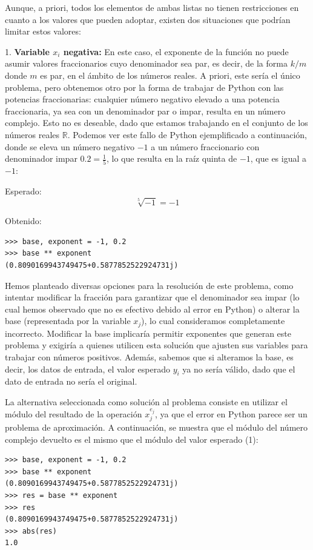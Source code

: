 \documentclass[conference,a4paper]{IEEEtran}
\begin{document}
Aunque, a priori, todos los elementos de ambas listas no tienen restricciones en cuanto a los valores que pueden adoptar, existen dos situaciones que podrían limitar estos valores:


1. \textbf{Variable \( x_i \) negativa:} En este caso, el exponente de la función no puede asumir valores fraccionarios cuyo denominador sea par, es decir, de la forma \( k/m \) donde \( m \) es par, en el ámbito de los números reales. A priori, este sería el único problema, pero obtenemos otro por la forma de trabajar de Python con las potencias fraccionarias: cualquier número negativo elevado a una potencia fraccionaria, ya sea con un denominador par o impar, resulta en un número complejo. Esto no es deseable, dado que estamos trabajando en el conjunto de los números reales \( \mathbb{R} \). Podemos ver este fallo de Python ejemplificado a continuación, donde se eleva un número negativo \( -1 \) a un número fraccionario con denominador impar \( 0.2 = \frac{1}{5} \), lo que resulta en la raíz quinta de \(-1\), que es igual a \(-1\):

Esperado:
\[
\sqrt[5]{-1} = -1
\]

Obtenido:
\begin{verbatim}
>>> base, exponent = -1, 0.2
>>> base ** exponent
(0.8090169943749475+0.5877852522924731j)
\end{verbatim}

Hemos planteado diversas opciones para la resolución de este problema, como intentar modificar la fracción para garantizar que el denominador sea impar (lo cual hemos observado que no es efectivo debido al error en Python) o alterar la base (representada por la variable \(x_j\)), lo cual consideramos completamente incorrecto. Modificar la base implicaría permitir exponentes que generan este problema y exigiría a quienes utilicen esta solución que ajusten sus variables para trabajar con números positivos. Además, sabemos que si alteramos la base, es decir, los datos de entrada, el valor esperado \(y_i\) ya no sería válido, dado que el dato de entrada no sería el original. 


La alternativa seleccionada como solución al problema consiste en utilizar el módulo del resultado de la operación \(x_j^{e_j}\), ya que el error en Python parece ser un problema de aproximación. A continuación, se muestra que el módulo del número complejo devuelto es el mismo que el módulo del valor esperado (1):

\begin{verbatim}
>>> base, exponent = -1, 0.2
>>> base ** exponent
(0.8090169943749475+0.5877852522924731j)
>>> res = base ** exponent
>>> res
(0.8090169943749475+0.5877852522924731j)
>>> abs(res)
1.0
\end{verbatim}
\end{document}
